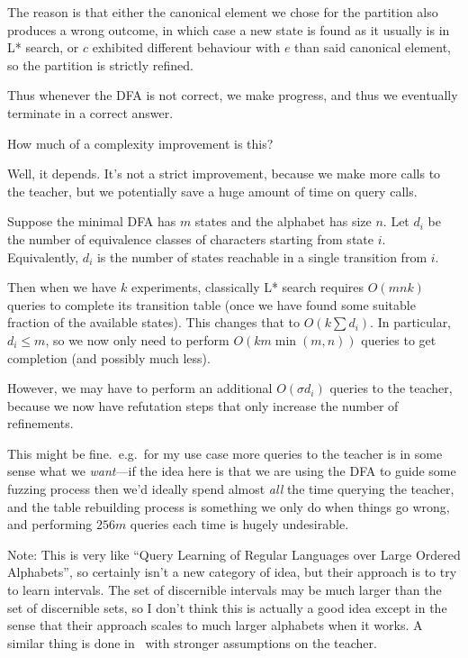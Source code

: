 \documentclass[a4paper]{book}
\begin{document}
The reason is that either the canonical element we chose for the partition also produces a wrong outcome,
in which case a new state is found as it usually is in L* search,
or \(c\) exhibited different behaviour with \(e\) than said canonical element,
so the partition is strictly refined.

Thus whenever the DFA is not correct,
we make progress,
and thus we eventually terminate in a correct answer.

How much of a complexity improvement is this?

Well, it depends.
It's not a strict improvement,
because we make more calls to the teacher,
but we potentially save a huge amount of time on query calls.

Suppose the minimal DFA has \(m\) states and the alphabet has size \(n\).
Let \(d_i\) be the number of equivalence classes of characters starting from state \(i\).
Equivalently,
\(d_i\) is the number of states reachable in a single transition from \(i\).

Then when we have \(k\) experiments,
classically L* search requires \(O(mnk)\) queries to complete its transition table (once we have found some suitable fraction of the available states).
This changes that to \(O(k \sum d_i)\).
In particular,
\(d_i \leq m\),
so we now only need to perform \(O(km \min(m, n)) \) queries to get completion (and possibly much less).

However,
we may have to perform an additional \(O(\sigma d_i)\) queries to the teacher,
because we now have refutation steps that only increase the number of refinements.

This might be fine.\
e.g.\ for my use case more queries to the teacher is in some sense what we \emph{want}---if
the idea here is that we are using the DFA to guide some fuzzing process then we'd ideally spend almost \emph{all} the time querying the teacher,
and the table rebuilding process is something we only do when things go wrong,
and performing \(256 m\) queries each time is hugely undesirable.

Note: This is very like ``Query Learning of Regular Languages over Large Ordered Alphabets''\cite{Kaizaburo2017LearnAut},
so certainly isn't a new category of idea,
but their approach is to try to learn intervals.
The set of discernible intervals may be much larger than the set of discernible sets,
so I don't think this is actually a good idea except in the sense that their approach scales to much larger alphabets when it works.
A similar thing is done in~\cite{DBLP:journals/corr/MensM15} with stronger assumptions on the teacher.
\end{document}
